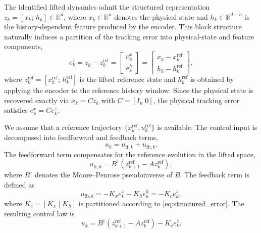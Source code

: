 \documentclass[journal]{IEEEtran}
\begin{document}
The identified lifted dynamics admit the structured representation $z_k = [x_k;\, h_k] \in \mathbb{R}^d$, where $x_k \in \mathbb{R}^n$ denotes the physical state and $h_k \in \mathbb{R}^{d-n}$ is the history-dependent feature produced by the encoder. This block structure naturally induces a partition of the tracking error into physical-state and feature components,
\begin{equation}
    e_k^z = z_k - z_k^{\mathrm{ref}} 
    = \begin{bmatrix} e_k^x \\ e_k^h \end{bmatrix}
    = \begin{bmatrix} x_k - x_k^{\mathrm{ref}} \\ h_k - h_k^{\mathrm{ref}} \end{bmatrix},
    \label{eq:structured_error}
\end{equation}
where $z_k^{\mathrm{ref}} = [x_k^{\mathrm{ref}};\, h_k^{\mathrm{ref}}]$ is the lifted reference state and $h_k^{\mathrm{ref}}$ is obtained by applying the encoder to the reference history window. Since the physical state is recovered exactly via $x_k = C z_k$ with $C = [I_n\;0]$, the physical tracking error satisfies $e_k^x = C e_k^z$.

We assume that a reference trajectory $\{x_k^{\mathrm{ref}}, u_k^{\mathrm{ref}}\}$ is available. The control input is decomposed into feedforward and feedback terms,
\begin{equation}
    u_k = u_{\mathrm{ff},k} + u_{\mathrm{fb},k}.
    \label{eq:ctrl_decomp}
\end{equation}
The feedforward term compensates for the reference evolution in the lifted space,
\begin{equation}
    u_{\mathrm{ff},k} = B^\dagger\!\left(z_{k+1}^{\mathrm{ref}} - A z_k^{\mathrm{ref}}\right),
    \label{eq:feedforward}
\end{equation}
where $B^\dagger$ denotes the Moore--Penrose pseudoinverse of $B$. The feedback term is defined as
\begin{equation}
    u_{\mathrm{fb},k} = -K_x e_k^x - K_h e_k^h = -K_c e_k^z,
    \label{eq:hierarchical_fb}
\end{equation}
where $K_c = [K_x\;|\;K_h]$ is partitioned according to \eqref{eq:structured_error}. The resulting control law is
\begin{equation}
    u_k = B^\dagger\!\left(z_{k+1}^{\mathrm{ref}} - A z_k^{\mathrm{ref}}\right) - K_c e_k^z.
    \label{eq:full_ctrl}
\end{equation}
\end{document}
